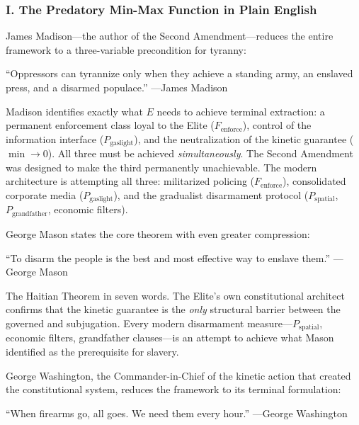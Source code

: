 \documentclass[12pt,openany]{book}
\begin{document}
\subsubsection*{I. The Predatory Min-Max Function in Plain English}

James Madison---the author of the Second Amendment---reduces the entire framework to a three-variable precondition for tyranny:

\begin{historicalsource}
``Oppressors can tyrannize only when they achieve a standing army, an enslaved press, and a disarmed populace.'' \hfill ---James Madison
\end{historicalsource}

Madison identifies exactly what $E$ needs to achieve terminal extraction: a permanent enforcement class loyal to the Elite ($F_{\text{enforce}}$), control of the information interface ($P_{\text{gaslight}}$), and the neutralization of the kinetic guarantee ($\min \rightarrow 0$). All three must be achieved \textit{simultaneously}. The Second Amendment was designed to make the third permanently unachievable. The modern architecture is attempting all three: militarized policing ($F_{\text{enforce}}$), consolidated corporate media ($P_{\text{gaslight}}$), and the gradualist disarmament protocol ($P_{\text{spatial}}$, $P_{\text{grandfather}}$, economic filters).

George Mason states the core theorem with even greater compression:

\begin{historicalsource}
``To disarm the people is the best and most effective way to enslave them.'' \hfill ---George Mason
\end{historicalsource}

The Haitian Theorem in seven words. The Elite's own constitutional architect confirms that the kinetic guarantee is the \textit{only} structural barrier between the governed and subjugation. Every modern disarmament measure---$P_{\text{spatial}}$, economic filters, grandfather clauses---is an attempt to achieve what Mason identified as the prerequisite for slavery.

George Washington, the Commander-in-Chief of the kinetic action that created the constitutional system, reduces the framework to its terminal formulation:

\begin{historicalsource}
``When firearms go, all goes. We need them every hour.'' \hfill ---George Washington
\end{historicalsource}
\end{document}
